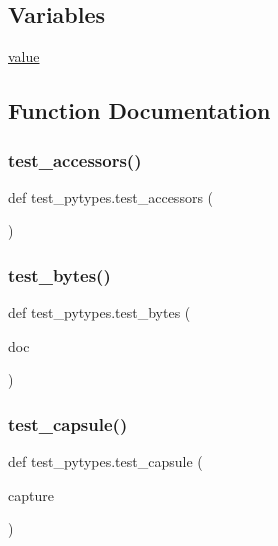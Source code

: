\subsection*{Variables}
\begin{DoxyCompactItemize}
\item 
\mbox{\hyperlink{namespacetest__pytypes_ad5f207f79ea61ee0184a521bc31189fa}{value}}
\end{DoxyCompactItemize}


\subsection{Function Documentation}
\mbox{\label{namespacetest__pytypes_a974fda8fd61d3e2048c63f9e0d3a83f1}} 
\subsubsection{\texorpdfstring{test\_accessors()}{test\_accessors()}}
{\footnotesize\ttfamily def test\+\_\+pytypes.\+test\+\_\+accessors (\begin{DoxyParamCaption}{ }\end{DoxyParamCaption})}

\mbox{\label{namespacetest__pytypes_a3ed975f2b5bdccc7e1d27029b2546d04}} 
\subsubsection{\texorpdfstring{test\_bytes()}{test\_bytes()}}
{\footnotesize\ttfamily def test\+\_\+pytypes.\+test\+\_\+bytes (\begin{DoxyParamCaption}\item[{}]{doc }\end{DoxyParamCaption})}

\mbox{\label{namespacetest__pytypes_ad1c7208937b2181294ac18a5c499e20f}} 
\subsubsection{\texorpdfstring{test\_capsule()}{test\_capsule()}}
{\footnotesize\ttfamily def test\+\_\+pytypes.\+test\+\_\+capsule (\begin{DoxyParamCaption}\item[{}]{capture }\end{DoxyParamCaption})}

